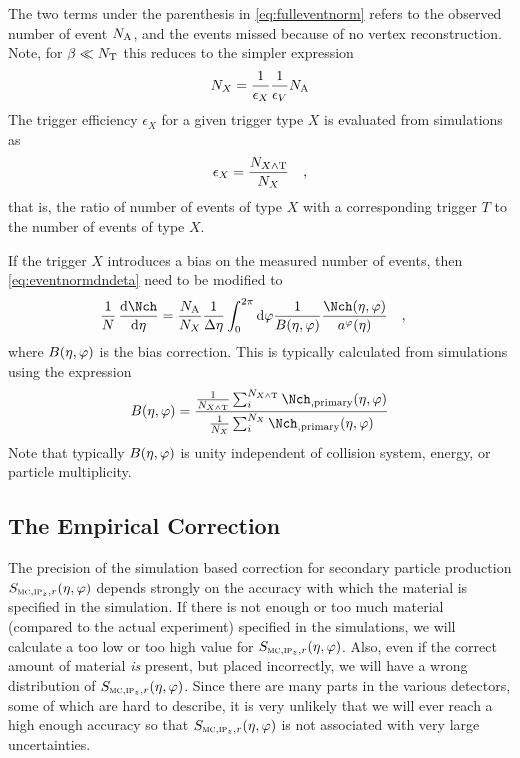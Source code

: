 The two terms under the parenthesis in \eqref{eq:fulleventnorm} refers
to the observed number of event ${N_{\text{A}}}$, and the events missed because
of no vertex reconstruction.  Note, for $\beta\ll{\ensuremath N_{\text{T}}}{}$
this reduces to the simpler expression
$$
{N_{X}} = \frac1{\epsilon_X}\frac1{\epsilon_V}{N_{\text{A}}}{}
$$
The trigger efficiency $\epsilon_X$ for a given trigger type $X$ is
evaluated from simulations as
\begin{align*}
  \epsilon_X = \frac{{N_{X\wedge \text{T}}}}{{N_{X}}}\quad,
\end{align*}
that is, the ratio of number of events of type $X$ with a
corresponding trigger $T$ to the number of events of type $X$.

If the trigger $X$ introduces a bias on the measured number of events,
then \eqref{eq:eventnormdndeta} need to be modified to 
\begin{align}
  \ndndeta &= 
  \frac{\NA}{\N{X}{}}\frac1{\Delta\eta} \int_0^{2\pi} \text{d}\varphi
  \frac{1}{B\etaphi}\frac{\dndetadphi}{\PhiAcc}
  \label{eq:eventnormdndeta2}\quad,
\end{align}
where $B(\eta,\varphi)$ is the bias correction.  This is typically
calculated from simulations using the expression 
\begin{align*}
  B\etaphi = \frac{\frac{1}{\N{X\wedge \text{T}}{}}\sum_i^{\N{X\wedge
        \text{T}}{}}
    \mult[,\text{primary}]\etaphi}{\frac{1}{\N{X}{}}\sum_i^{\N{X}{}}
    \mult[,\text{primary}]\etaphi}
\end{align*}
Note that typically $B(\eta,\varphi)$ is unity independent of collision
system, energy, or particle multiplicity. 

\subsection{The Empirical Correction} 
\label{sec:sub:empirical} 

The precision of the simulation based correction for secondary
particle production $\SecMap{}$ depends strongly on the accuracy with
which the material is specified in the simulation.  If there is not
enough or too much material (compared to the actual experiment)
specified in the simulations, we will calculate a too low or too high
value for $\SecMap$.  Also, even if the correct amount of material
\emph{is} present, but placed incorrectly, we will have a wrong
distribution of $\SecMap$.  Since there are many parts in the various
detectors, some of which are hard to describe, it is very unlikely
that we will ever reach a high enough accuracy so that $\SecMap$ is
not associated with very large uncertainties.

